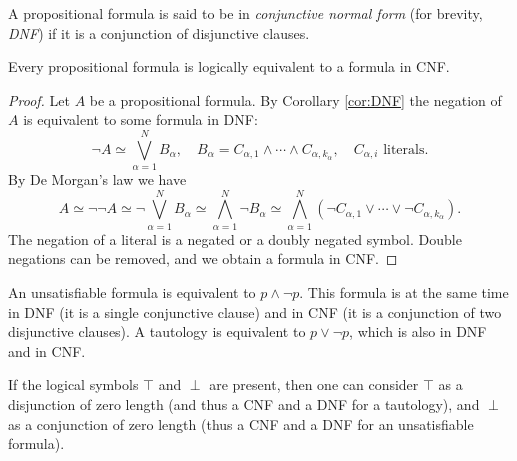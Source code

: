 \begin{page}
\setcounter{section}{1}
\setcounter{subsection}{5}
\setcounter{dfn}{18}
\label{portion:465}

\begin{dfn}
A propositional formula is said to be in \emph{conjunctive normal form} (for brevity, \emph{DNF})
if it is a conjunction of disjunctive clauses.
\end{dfn}

\end{page}

\begin{page}
\setcounter{section}{1}
\setcounter{subsection}{5}
\setcounter{dfn}{19}
\label{portion:468}

\begin{thm}
Every propositional formula is logically equivalent to a formula in CNF.
\end{thm}

\end{page}

\begin{page}
\setcounter{section}{1}
\setcounter{subsection}{5}
\setcounter{dfn}{19}
\label{portion:469}

\begin{proof}
Let $A$ be a propositional formula.
By Corollary \ref{cor:DNF} the negation of $A$ is equivalent to some formula in DNF:
\[
\neg A \simeq \bigvee_{\alpha = 1}^N B_\alpha, \quad B_\alpha = C_{\alpha,1} \wedge \cdots \wedge C_{\alpha,k_{\alpha}}, \quad C_{\alpha,i} \text{ literals}.
\]
By De Morgan's law we have
\[
A \simeq \neg\neg A \simeq \neg \bigvee_{\alpha = 1}^N B_\alpha \simeq \bigwedge_{\alpha = 1}^N \neg B_\alpha
\simeq \bigwedge_{\alpha = 1}^N (\neg C_{\alpha,1} \vee \cdots \vee \neg C_{\alpha,k_{\alpha}}).
\]
The negation of a literal is a negated or a doubly negated symbol.
Double negations can be removed, and we obtain a formula in CNF.
\end{proof}

An unsatisfiable formula is equivalent to $p \wedge \neg p$.
This formula is at the same time in DNF (it is a single conjunctive clause) and in CNF (it is a conjunction of two disjunctive clauses).
A tautology is equivalent to $p \vee \neg p$, which is also in DNF and in CNF.


\end{page}

\begin{page}
\setcounter{section}{1}
\setcounter{subsection}{5}
\setcounter{dfn}{20}
\label{portion:471}

\begin{rem}
If the logical symbols $\top$ and $\perp$ are present, then one can consider $\top$ as a disjunction of zero length
(and thus a CNF and a DNF for a tautology), and $\perp$ as a conjunction of zero length (thus a CNF and a DNF for an unsatisfiable formula).
\end{rem}

\end{page}

